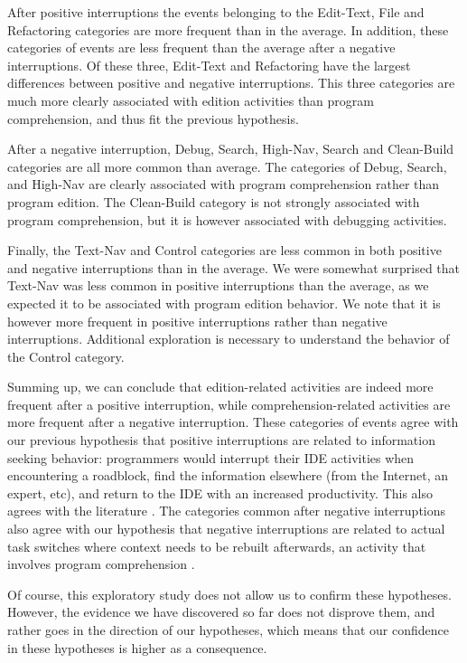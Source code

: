 After positive interruptions the events belonging to the Edit-Text, File and Refactoring categories are more frequent than in the average. In addition, these categories of events are less frequent than the average after a negative interruptions. Of these three, Edit-Text and Refactoring have the largest differences between positive and negative interruptions. This three categories are much more clearly associated with edition activities than program comprehension, and thus fit the previous hypothesis.

After a negative interruption, Debug, Search, High-Nav, Search and Clean-Build categories are all more common than average. The categories of Debug, Search, and High-Nav are clearly associated with program comprehension rather than program edition. The Clean-Build category is not strongly associated with program comprehension, but it is however associated with debugging activities. 

Finally, the Text-Nav and Control categories are less common in both positive and negative interruptions than in the average. We were somewhat surprised that Text-Nav was less common in positive interruptions than the average, as we expected it to be associated with program edition behavior. We note that it is however more frequent in positive interruptions rather than negative interruptions. Additional exploration is necessary to understand the behavior of the Control category.

Summing up, we can conclude that edition-related activities are indeed more frequent after a positive interruption, while comprehension-related activities are more frequent after a negative interruption.  These categories of events agree with our previous hypothesis that positive interruptions are related to information seeking behavior: programmers would interrupt their IDE activities when encountering a roadblock, find the information elsewhere (from the Internet, an expert, etc), and return to the IDE with an increased productivity. This also agrees with the literature \cite{PR11, LVD06}. The categories common after negative interruptions also agree with our hypothesis that negative interruptions are related to actual task switches where context needs to be rebuilt afterwards, an activity that involves program comprehension \cite{MMLK14, PR12}. %

Of course, this exploratory study does not allow us to confirm these hypotheses. However, the evidence we have discovered so far does not disprove them, and rather goes in the direction of our hypotheses, which means that our confidence in these hypotheses is higher as a consequence.

